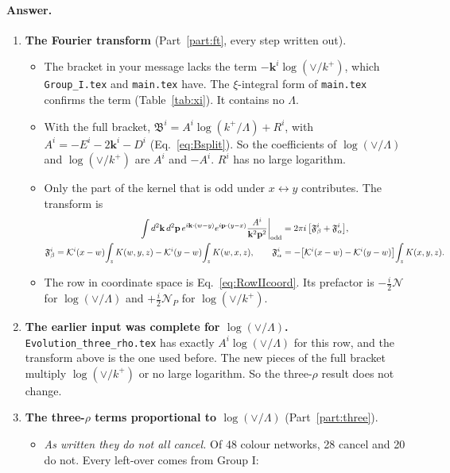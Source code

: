 \documentclass[10pt]{article}
\numberwithin{equation}{section}
\newcommand{\KK}{\mathcal K}
\newcommand{\NN}{\mathcal N}
\newcommand{\NP}{\mathcal N_{P}}
\newcommand{\bk}{\mathbf k}
\newcommand{\bp}{\mathbf p}
\begin{document}
\paragraph{Answer.}
\begin{enumerate}
\item \textbf{The Fourier transform} (Part~\ref{part:ft}, every step written out).
\begin{itemize}
\item The bracket in your message lacks the term $-\bk^i\log(\vee/k^+)$, which \texttt{Group\_I.tex} and \texttt{main.tex} have. The $\xi$-integral form of \texttt{main.tex} confirms the term (Table~\ref{tab:xi}). It contains no $\Lambda$.
\item With the full bracket, $\mathfrak B^i=A^i\log(k^+/\Lambda)+R^i$, with $A^i=-E^i-2\bk^i-D^i$ (Eq.~\eqref{eq:Bsplit}). So the coefficients of $\log(\vee/\Lambda)$ and $\log(\vee/k^+)$ are $A^i$ and $-A^i$. $R^i$ has no large logarithm.
\item Only the part of the kernel that is odd under $x\leftrightarrow y$ contributes. The transform is
\begin{gather*}
\int d^2\bk\,d^2\bp\,e^{i\bk\cdot(w-y)}e^{i\bp\cdot(y-x)}\frac{A^i}{\bk^2\bp^2}\bigg|_{\rm odd}=2\pi i\,\big[\mathfrak F_\beta^i+\mathfrak F_\alpha^i\big],\\
\mathfrak F^i_\beta=\KK^i(x-w)\!\int_zK(w,y,z)-\KK^i(y-w)\!\int_zK(w,x,z),\qquad
\mathfrak F^i_\alpha=-\big[\KK^i(x-w)-\KK^i(y-w)\big]\!\int_zK(x,y,z).
\end{gather*}
\item The row in coordinate space is Eq.~\eqref{eq:RowIIcoord}. Its prefactor is $-\frac i2\NN$ for $\log(\vee/\Lambda)$ and $+\frac i2\NP$ for $\log(\vee/k^+)$.
\end{itemize}
\item \textbf{The earlier input was complete for $\log(\vee/\Lambda)$.} \texttt{Evolution\_three\_rho.tex} has exactly $A^i\log(\vee/\Lambda)$ for this row, and the transform above is the one used before. The new pieces of the full bracket multiply $\log(\vee/k^+)$ or no large logarithm. So the three-$\rho$ result does not change.
\item \textbf{The three-$\rho$ terms proportional to $\log(\vee/\Lambda)$} (Part~\ref{part:three}).
\begin{itemize}
\item \emph{As written they do not all cancel.} Of 48 colour networks, 28 cancel and 20 do not. Every left-over comes from Group I:
\begin{itemize}

\end{itemize}
\end{itemize}
\end{enumerate}
\end{document}
